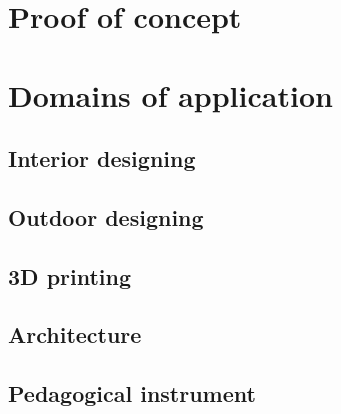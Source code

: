 \section{Proof of concept}

\section{Domains of application}
\subsection{Interior designing}
\subsection{Outdoor designing}
\subsection{3D printing}
\subsection{Architecture}
\subsection{Pedagogical instrument}
